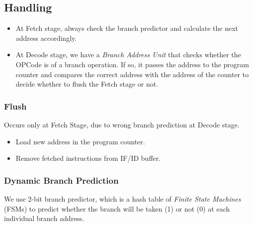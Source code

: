 \documentclass[12pt]{report}
\begin{document}
\subsection{Handling}
\begin{itemize}
    \item At Fetch stage, always check the branch predictor and calculate the next address accordingly.
    \item At Decode stage, we have a \emph{Branch Address Unit} that checks whether the OPCode is of a branch operation. If so, it passes the address to the program counter and compares the correct address with the address of the counter to decide whether to flush the Fetch stage or not. 
\end{itemize}

\subsubsection{Flush}
Occurs only at Fetch Stage, due to wrong branch prediction at Decode stage.
\begin{itemize}
    \item Load new address in the program counter.
    \item Remove fetched instructions from IF/ID buffer.
\end{itemize}

\subsubsection{Dynamic Branch Prediction}
We use 2-bit branch predictor, which is a hash table of \emph{Finite State Machines} (FSMs) to predict whether the branch will be taken (1) or not (0) at each individual branch address.
\end{document}
